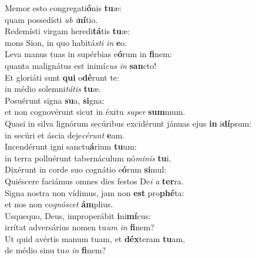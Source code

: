 \evenverse Memor esto congregati\textbf{ó}nis \textbf{tu}æ:~\*\\
\evenverse quam possedísti \textit{ab} \textit{i}\textbf{ní}tio.\\
\oddverse Redemísti virgam heredi\textbf{tá}tis \textbf{tu}æ:~\*\\
\oddverse mons Sion, in quo habitá\textit{sti} \textit{in} \textbf{e}o.\\
\evenverse Leva manus tuas in supérbias e\textbf{ó}rum in \textbf{fi}nem:~\*\\
\evenverse quanta malignátus est inimí\textit{cus} \textit{in} \textbf{san}cto!\\
\oddverse Et gloriáti sunt \textbf{qui} o\textbf{dé}runt te:~\*\\
\oddverse in médio solemni\textit{tá}\textit{tis} \textbf{tu}æ.\\
\evenverse Posuérunt signa \textbf{su}a, \textbf{si}gna:~\*\\
\evenverse et non cognovérunt sicut in éxitu \textit{su}\textit{per} \textbf{sum}mum.\\
\oddverse Quasi in silva lignórum secúribus excidérunt jánuas ejus \textbf{in} i\textbf{dí}psum:~\*\\
\oddverse in secúri et áscia deje\textit{cé}\textit{runt} \textbf{e}am.\\
\evenverse Incendérunt igni sanctu\textbf{á}rium \textbf{tu}um:~\*\\
\evenverse in terra polluérunt tabernáculum nó\textit{mi}\textit{nis} \textbf{tu}i.\\
\oddverse Dixérunt in corde suo cognátio e\textbf{ó}rum \textbf{si}mul:~\*\\
\oddverse Quiéscere faciámus omnes dies festos De\textit{i} \textit{a} \textbf{ter}ra.\\
\evenverse Signa nostra non vídimus, jam non \textbf{est} pro\textbf{phé}ta:~\*\\
\evenverse et nos non co\textit{gnó}\textit{scet} \textbf{ám}plius.\\
\oddverse Usquequo, Deus, improperábit \textbf{i}ni\textbf{mí}cus:~\*\\
\oddverse irrítat adversárius nomen tu\textit{um} \textit{in} \textbf{fi}nem?\\
\evenverse Ut quid avértis manum tuam, et \textbf{déx}teram \textbf{tu}am,~\*\\
\evenverse de médio sinu tu\textit{o} \textit{in} \textbf{fi}nem?\\
